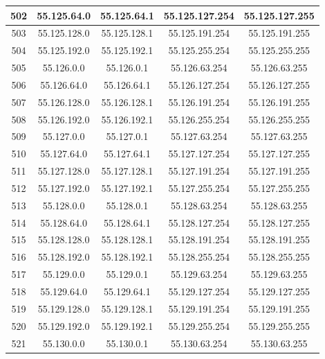 \documentclass[letterpaper,12pt]{article}
\begin{document}
\begin{center}
\begin{longtable}{|c|c|c|c|c|}
                502 & 55.125.64.0 & 55.125.64.1 & 55.125.127.254 & 55.125.127.255 \\ \hline
                503 & 55.125.128.0 & 55.125.128.1 & 55.125.191.254 & 55.125.191.255 \\ \hline
                504 & 55.125.192.0 & 55.125.192.1 & 55.125.255.254 & 55.125.255.255 \\ \hline
                505 & 55.126.0.0 & 55.126.0.1 & 55.126.63.254 & 55.126.63.255 \\ \hline
                506 & 55.126.64.0 & 55.126.64.1 & 55.126.127.254 & 55.126.127.255 \\ \hline
                507 & 55.126.128.0 & 55.126.128.1 & 55.126.191.254 & 55.126.191.255 \\ \hline
                508 & 55.126.192.0 & 55.126.192.1 & 55.126.255.254 & 55.126.255.255 \\ \hline
                509 & 55.127.0.0 & 55.127.0.1 & 55.127.63.254 & 55.127.63.255 \\ \hline
                510 & 55.127.64.0 & 55.127.64.1 & 55.127.127.254 & 55.127.127.255 \\ \hline
                511 & 55.127.128.0 & 55.127.128.1 & 55.127.191.254 & 55.127.191.255 \\ \hline
                512 & 55.127.192.0 & 55.127.192.1 & 55.127.255.254 & 55.127.255.255 \\ \hline
                513 & 55.128.0.0 & 55.128.0.1 & 55.128.63.254 & 55.128.63.255 \\ \hline
                514 & 55.128.64.0 & 55.128.64.1 & 55.128.127.254 & 55.128.127.255 \\ \hline
                515 & 55.128.128.0 & 55.128.128.1 & 55.128.191.254 & 55.128.191.255 \\ \hline
                516 & 55.128.192.0 & 55.128.192.1 & 55.128.255.254 & 55.128.255.255 \\ \hline
                517 & 55.129.0.0 & 55.129.0.1 & 55.129.63.254 & 55.129.63.255 \\ \hline
                518 & 55.129.64.0 & 55.129.64.1 & 55.129.127.254 & 55.129.127.255 \\ \hline
                519 & 55.129.128.0 & 55.129.128.1 & 55.129.191.254 & 55.129.191.255 \\ \hline
                520 & 55.129.192.0 & 55.129.192.1 & 55.129.255.254 & 55.129.255.255 \\ \hline
                521 & 55.130.0.0 & 55.130.0.1 & 55.130.63.254 & 55.130.63.255 \\ \hline

\end{longtable}
\end{center}
\end{document}
